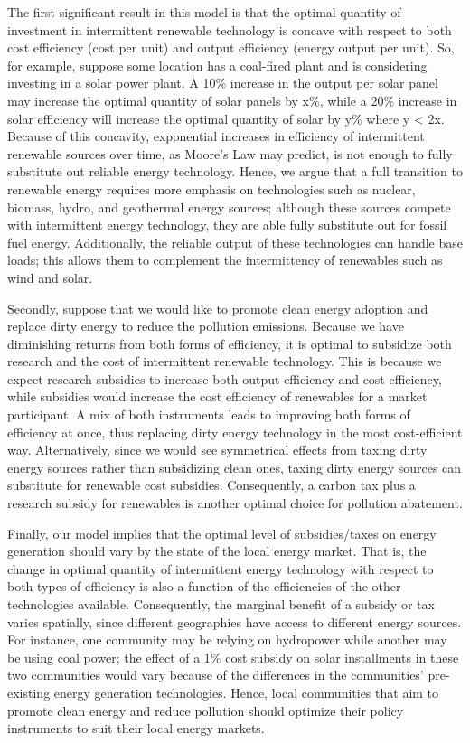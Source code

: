 \documentclass[11pt,a4paper]{extarticle}
\begin{document}
The first significant result in this model is that the optimal quantity of investment in intermittent renewable technology is concave with respect to both cost efficiency (cost per unit) and output efficiency (energy output per unit). So, for example, suppose some location has a coal-fired plant and is considering investing in a solar power plant. A 10\% increase in the output per solar panel may increase the optimal quantity of solar panels by x\%, while a 20\% increase in solar efficiency will increase the optimal quantity of solar by y\% where y < 2x. Because of this concavity, exponential increases in efficiency of intermittent renewable sources over time, as Moore’s Law may predict, is not enough to fully substitute out reliable energy technology. Hence, we argue that a full transition to renewable energy requires more emphasis on technologies such as nuclear, biomass, hydro, and geothermal energy sources; although these sources compete with intermittent energy technology, they are able fully substitute out for fossil fuel energy. Additionally, the reliable output of these technologies can handle base loads; this allows them to complement the intermittency of renewables such as wind and solar. 

Secondly, suppose that we would like to promote clean energy adoption and replace dirty energy to reduce the pollution emissions. Because we have diminishing returns from both forms of efficiency, it is optimal to subsidize both research and the cost of intermittent renewable technology. This is because we expect research subsidies to increase both output efficiency and cost efficiency, while subsidies would increase the cost efficiency of renewables for a market participant. A mix of both instruments leads to improving both forms of efficiency at once, thus replacing dirty energy technology in the most cost-efficient way. Alternatively, since we would see symmetrical effects from taxing dirty energy sources rather than subsidizing clean ones, taxing dirty energy sources can substitute for renewable cost subsidies. Consequently, a carbon tax plus a research subsidy for renewables is another optimal choice for pollution abatement. 

Finally, our model implies that the optimal level of subsidies/taxes on energy generation should vary by the state of the local energy market. That is, the change in optimal quantity of intermittent energy technology with respect to both types of efficiency is also a function of the efficiencies of the other technologies available. Consequently, the marginal benefit of a subsidy or tax varies spatially, since different geographies have access to different energy sources. For instance, one community may be relying on hydropower while another may be using coal power; the effect of a 1\% cost subsidy on solar installments in these two communities would vary because of the differences in the communities’ pre-existing energy generation technologies. Hence, local communities that aim to promote clean energy and reduce pollution should optimize their policy instruments to suit their local energy markets. 
\end{document}
